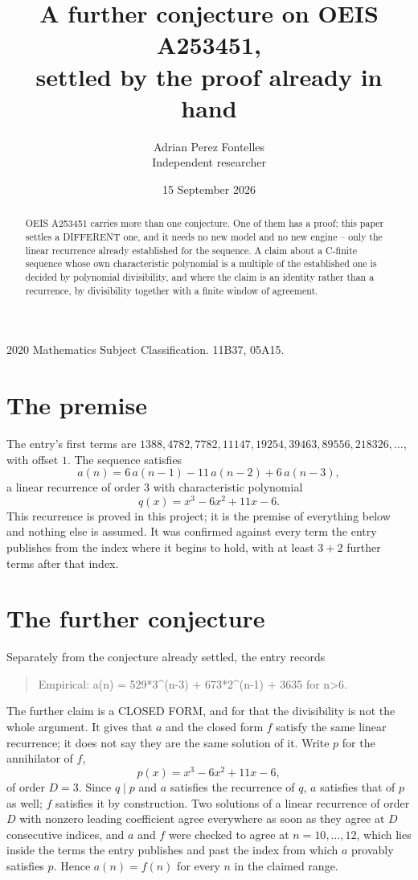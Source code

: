\documentclass[11pt,a4paper]{article}
\title{A further conjecture on OEIS A253451,\\ \large settled by the proof already in hand}
\author{Adrian Perez Fontelles\\ \small Independent researcher}
\date{15 September 2026}
\theoremstyle{plain}
\theoremstyle{definition}
\begin{document}
\maketitle

\begin{abstract}
OEIS A253451 carries more than one conjecture. One of them has a proof; this paper settles a
DIFFERENT one, and it needs no new model and no new engine -- only the linear recurrence already
established for the sequence. A claim about a C-finite sequence whose own characteristic
polynomial is a multiple of the established one is decided by polynomial divisibility, and where
the claim is an identity rather than a recurrence, by divisibility together with a finite window
of agreement.
\end{abstract}

\noindent\small 2020 Mathematics Subject Classification. 11B37, 05A15.\normalsize

\section{The premise}

The entry's first terms are $1388, 4782, 7782, 11147, 19254, 39463, 89556, 218326,\dots$, with offset $1$. The sequence satisfies
\[
  a(n)=6\,a(n-1) - 11\,a(n-2) + 6\,a(n-3) ,
\]
a linear recurrence of order $3$ with characteristic polynomial
\[
  q(x)=x^{3} - 6 x^{2} + 11 x - 6 .
\]
This recurrence is proved in this project; it is the premise of everything below and nothing else is assumed.
It was confirmed against every term the entry publishes from the index where it begins to hold,
with at least $3+2$ further terms after that index.

\section{The further conjecture}

Separately from the conjecture already settled, the entry records

\begin{quote}\raggedright Empirical: a(n) = 529*3\^{}(n-3) + 673*2\^{}(n-1) + 3635 for n>6.\end{quote}

The further claim is a CLOSED FORM, and for that the divisibility is not the whole argument. It
gives that $a$ and the closed form $f$ satisfy the same linear recurrence; it does not say they
are the same solution of it. Write $p$ for the annihilator of $f$,
\[
  p(x)=x^{3} - 6 x^{2} + 11 x - 6 ,
\]
of order $D=3$. Since $q\mid p$ and $a$ satisfies the recurrence of $q$, $a$ satisfies that of
$p$ as well; $f$ satisfies it by construction. Two solutions of a linear recurrence of order $D$
with nonzero leading coefficient agree everywhere as soon as they agree at $D$ consecutive
indices, and $a$ and $f$ were checked to agree at $n=10,\dots,12$,
which lies inside the terms the entry publishes and past the index from which $a$ provably
satisfies $p$. Hence $a(n)=f(n)$ for every $n$ in the claimed range.
\end{document}
